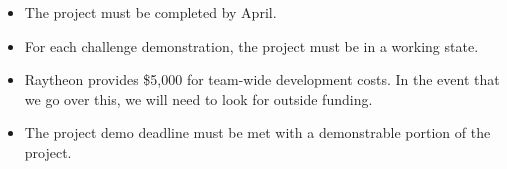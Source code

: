 
\begin{itemize}
  \item The project must be completed by April.
  \item For each challenge demonstration, the project must be in a working state.
  \item Raytheon provides \$5,000 for team-wide development costs. In the event that we go over this, we will need to look for outside funding.
  \item The project demo deadline must be met with a demonstrable portion of the project.
\end{itemize}
